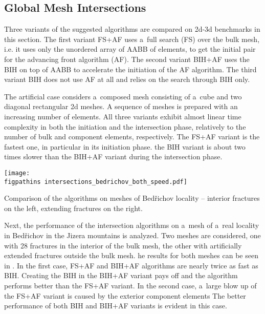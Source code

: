 \subsection{Global Mesh Intersections}
Three variants of the suggested algorithms are compared on 2d-3d benchmarks in this section.
The first variant FS+AF uses a~full search (FS) over the bulk mesh, i.e. it uses only the unordered array of AABB of elements,
to get the initial pair for the advancing front algorithm (AF).
The second variant BIH+AF uses the BIH on top of AABB to accelerate the initiation of the AF algorithm.
The third variant BIH does not use AF at all and relies on the search through BIH only. 

The artificial case considers a~composed mesh consisting of a~cube and two diagonal rectangular 2d meshes.
A sequence of meshes is prepared with an increasing number of elements.
All three variants exhibit almost linear time complexity in both the initiation and the intersection phase,
relatively to the number of bulk and component elements, respectively.
The FS+AF variant is the fastest one, in particular in its initiation phase.
the BIH variant is about two times slower than the BIH+AF variant during the intersection phase. 

\begin{graph}[!htb]
    \centering
    \texttt{[image: \\figpathins intersections\_bedrichov\_both\_speed.pdf]}
    \caption[Comparison of the algorithms on meshes of Bed{\v r}ichov locality.]
    {Comparison of the algorithms on meshes of Bed{\v r}ichov locality -- 
        interior fractures on the left,
        extending fractures on the right.}
    \label{graph:bedrichov_speed}
\end{graph}
%
Next, the performance of the intersection algorithms on a~mesh of a~real locality in Bed{\v r}ichov in the Jizera mountains
is analyzed. Two meshes are considered, one with 28 fractures in the interior of the bulk mesh, 
the other with artificially extended fractures outside the bulk mesh.
he results for both meshes can be seen in .
In the first case, FS+AF and BIH+AF algorithms are nearly twice as fast as BIH.
Creating the BIH in the BIH+AF variant pays off and the algorithm performs better than the FS+AF variant.
In the second case, a~large blow up of the FS+AF variant is caused by the exterior component elements
The better performance of both BIH and BIH+AF variants is evident in this case.




